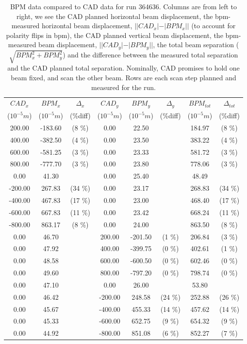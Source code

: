 \begin{table}
\centering
\begin{tabular}{c c c c c c c c}
\toprule
\textbf{$CAD_{x}$} & \textbf{$BPM_{x}$ } & \textbf{$\Delta_{x}$} &\textbf{$CAD_{y}$} & \textbf{$BPM_{y}$} & \textbf{$\Delta_{y}$} & \textbf{$BPM_{tot}$} & \textbf{$\Delta_{tot}$} \\
($10^{-5} m$) & ($10^{-5} m$) & (\%diff) & ($10^{-5} m$) & ($10^{-5} m$) & (\%diff) & ($10^{-5} m$) & (\%diff) \\
\midrule
200.00 & -183.60 &  (8 \%) & 0.00 & 22.50 &  & 184.97 &  (8 \%)\\
400.00 & -382.50 &  (4 \%) & 0.00 & 23.50 &  & 383.22 &  (4 \%)\\
600.00 & -581.25 &  (3 \%) & 0.00 & 23.33 &  & 581.72 &  (3 \%)\\
800.00 & -777.70 &  (3 \%) & 0.00 & 23.80 &  & 778.06 &  (3 \%)\\
0.00 & 41.30 &  & 0.00 & 25.40 &  & 48.49 & \\
-200.00 & 267.83 &  (34 \%) & 0.00 & 23.17 &  & 268.83 &  (34 \%)\\
-400.00 & 467.83 &  (17 \%) & 0.00 & 23.00 &  & 468.40 &  (17 \%)\\
-600.00 & 667.83 &  (11 \%) & 0.00 & 23.42 &  & 668.24 &  (11 \%)\\
-800.00 & 863.17 &  (8 \%) & 0.00 & 24.00 &  & 863.50 &  (8 \%)\\
0.00 & 46.70 &  & 200.00 & -201.50 &  (1 \%) & 206.84 &  (3 \%)\\
0.00 & 47.92 &  & 400.00 & -399.75 &  (0 \%) & 402.61 &  (1 \%)\\
0.00 & 48.58 &  & 600.00 & -600.50 &  (0 \%) & 602.46 &  (0 \%)\\
0.00 & 49.60 &  & 800.00 & -797.20 &  (0 \%) & 798.74 &  (0 \%)\\
0.00 & 47.10 &  & 0.00 & 26.00 &  & 53.80 & \\
0.00 & 46.42 &  & -200.00 & 248.58 &  (24 \%) & 252.88 &  (26 \%)\\
0.00 & 45.67 &  & -400.00 & 455.33 &  (14 \%) & 457.62 &  (14 \%)\\
0.00 & 45.33 &  & -600.00 & 652.75 &  (9 \%) & 654.32 &  (9 \%)\\
0.00 & 44.92 &  & -800.00 & 851.08 &  (6 \%) & 852.27 &  (7 \%)\\
\bottomrule
\end{tabular}
\caption{ BPM data compared to CAD data for run 364636. Columns are from left to right, we see the CAD planned horizontal beam displacement, the bpm-measured horizontal beam displacement, $||CAD_{x}| - |BPM_{x}||$ (to account for polarity flips in bpm), the CAD planned vertical beam displacement, the bpm-measured beam displacement, $||CAD_{y}| - |BPM_{y}||$, the total beam separation ($\sqrt{BPM_{x}^2+BPM_{y}^2}$) and the difference between the measured total separation and the CAD planned total separation. Nominally, CAD promises to hold one beam fixed, and scan the other beam. Rows are each scan step planned and measured for the run. }
\label{0xff9ededc}
\end{table}
